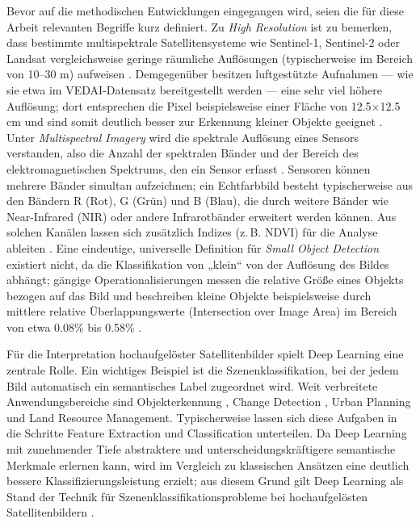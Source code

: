 Bevor auf die methodischen Entwicklungen eingegangen wird, seien die für diese Arbeit relevanten Begriffe kurz definiert. Zu \emph{High Resolution} ist zu bemerken, dass bestimmte multispektrale Satellitensysteme wie Sentinel-1, Sentinel-2 oder Landsat vergleichsweise geringe räumliche Auflösungen (typischerweise im Bereich von 10–30 m) aufweisen \cite{Wieland2023}. Demgegenüber besitzen luftgestützte Aufnahmen — wie sie etwa im VEDAI-Datensatz bereitgestellt werden — eine sehr viel höhere Auflösung; dort entsprechen die Pixel beispielsweise einer Fläche von 12.5\(\times\)12.5 cm und sind somit deutlich besser zur Erkennung kleiner Objekte geeignet \cite{Razakarivony2015}. Unter \emph{Multispectral Imagery} wird die spektrale Auflösung eines Sensors verstanden, also die Anzahl der spektralen Bänder und der Bereich des elektromagnetischen Spektrums, den ein Sensor erfasst \cite{Khan2018}. Sensoren können mehrere Bänder simultan aufzeichnen; ein Echtfarbbild besteht typischerweise aus den Bändern R (Rot), G (Grün) und B (Blau), die durch weitere Bänder wie Near-Infrared (NIR) oder andere Infrarotbänder erweitert werden können. Aus solchen Kanälen lassen sich zusätzlich Indizes (z.\,B. NDVI) für die Analyse ableiten \cite{Wiley2018}. Eine eindeutige, universelle Definition für \emph{Small Object Detection} existiert nicht, da die Klassifikation von „klein“ von der Auflösung des Bildes abhängt; gängige Operationalisierungen messen die relative Größe eines Objekts bezogen auf das Bild und beschreiben kleine Objekte beispielsweise durch mittlere relative Überlappungswerte (Intersection over Image Area) im Bereich von etwa 0.08\% bis 0.58\% \cite{Chen2017}.

Für die Interpretation hochaufgelöster Satellitenbilder spielt Deep Learning eine zentrale Rolle. Ein wichtiges Beispiel ist die Szenenklassifikation, bei der jedem Bild automatisch ein semantisches Label zugeordnet wird. Weit verbreitete Anwendungsbereiche sind Objekterkennung \cite{Bhagavathy2006,Cheng2016}, Change Detection \cite{Chen2006}, Urban Planning und Land Resource Management. Typischerweise lassen sich diese Aufgaben in die Schritte Feature Extraction und Classification unterteilen. Da Deep Learning mit zunehmender Tiefe abstraktere und unterscheidungskräftigere semantische Merkmale erlernen kann, wird im Vergleich zu klassischen Ansätzen eine deutlich bessere Klassifizierungsleistung erzielt; aus diesem Grund gilt Deep Learning als Stand der Technik für Szenenklassifikationsprobleme bei hochaufgelösten Satellitenbildern \cite{Zhu2017}.

